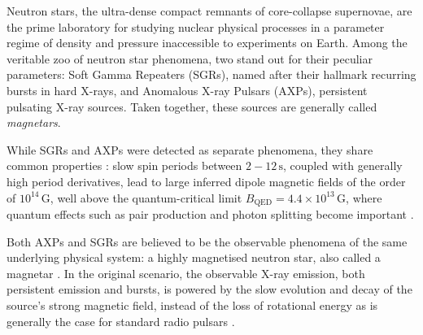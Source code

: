 \documentclass[12pt]{emulateapj}
\begin{document}
Neutron stars, the ultra-dense compact remnants of core-collapse supernovae, are the prime laboratory for studying nuclear 
physical processes in a parameter regime of density and pressure inaccessible to experiments on Earth. 
Among the veritable zoo of neutron star phenomena, two stand out for their peculiar parameters: Soft Gamma Repeaters (SGRs),
named after their hallmark recurring bursts in hard X-rays, and Anomalous X-ray Pulsars (AXPs), persistent pulsating X-ray
sources. Taken together, these sources are generally called {\it magnetars}. 

While SGRs and AXPs were detected as separate phenomena, they share common properties \citep[for general overviews of both phenomena, see ][]{woods2006,mereghetti2011}: slow spin periods between
$2 - 12 \, \mathrm{s}$, coupled with generally high period derivatives, lead to large inferred dipole magnetic fields of
the order of $10^{14} \, \mathrm{G}$, well above the quantum-critical limit $B_{\mathrm{QED}} = 4.4 \times 10^{13} \, \mathrm{G}$,
where quantum effects such as pair production and photon splitting become important \citep[although three sources have been 
identified with properties similar to magnetars, but inferred dipole fields below this limit;][]{vanderhorst2010,esposito2010,rea2010,rea2012,scholz2012,rea2014}. 

Both AXPs and SGRs are believed to be the observable phenomena of the same underlying physical system: a highly magnetised
neutron star, also called a magnetar \citep{duncan1992,thompson1995}. In the original scenario, the observable X-ray emission, both persistent emission and bursts, 
is powered by the slow evolution and decay of the source's strong magnetic field, instead of the loss of rotational energy as 
is generally the case for standard radio pulsars \citep{thompson1995,thompson2001}. 

\end{document}
